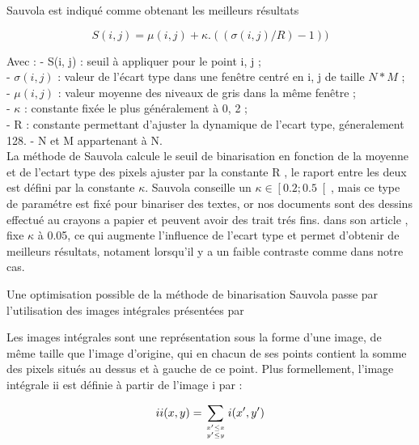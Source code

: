 Sauvola est indiqué comme obtenant les meilleurs résultats

\begin{equation}
	S(i,j) = \mu(i,j) + \kappa.((\sigma(i,j)/R)-1))
\end{equation}

Avec :
- S(i, j) : seuil à appliquer pour le point i, j ;\\
- $\sigma(i, j)$ : valeur de l’écart type dans une fenêtre centré en i, j de taille $N * M$ ;\\
- $\mu(i, j)$ : valeur moyenne des niveaux de gris dans la même fenêtre ;\\
- $\kappa$ : constante fixée le plus généralement à 0, 2 ;\\
- R : constante permettant d'ajuster la dynamique de l'ecart type, géneralement 128.
- N et M appartenant à N.\\

La méthode de Sauvola calcule le seuil de binarisation en fonction de la moyenne et de l'ectart type des pixels ajuster par la constante R , le raport entre les deux est défini par la constante $\kappa$.
Sauvola conseille un $\kappa \in \left[ 0.2 ;0.5 \right[$, mais ce type de paramétre est fixé pour binariser des textes, or nos documents sont des dessins effectué au crayons a papier et peuvent avoir des trait trés fins.
dans son article  , fixe $\kappa$ à 0.05, ce qui augmente l'influence de l'ecart type et permet d'obtenir de meilleurs résultats, notament lorsqu'il y a un faible contraste comme dans notre cas.   

Une optimisation possible de la méthode de binarisation Sauvola passe par l'utilisation des images intégrales présentées par%

Les images intégrales sont une représentation sous la forme d'une image, de même taille que l'image d'origine, qui en chacun de ses points contient la somme des pixels situés au dessus et à gauche de ce point. Plus formellement, l'image intégrale ii est définie à partir de l'image i par : 

\begin{equation}
	ii(x,y) = \sum_{x' \leq x  \atop y' \leq y } i(x',y')
\end{equation}

%


